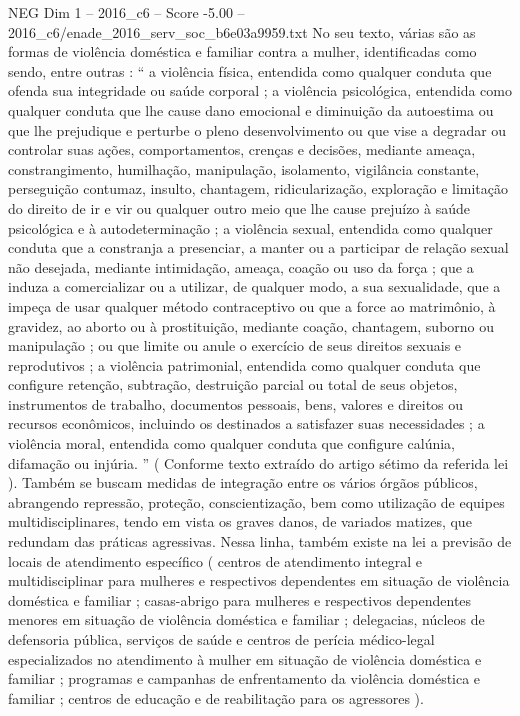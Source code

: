 \begin{textsample}{NEG Dim 1 – 2016\_c6 – Score -5.00 – 2016\_c6/enade\_2016\_serv\_soc\_b6e03a9959.txt}
No seu texto, várias são as formas de violência doméstica e familiar contra a mulher, identificadas como sendo, entre outras : “ a violência física, entendida como qualquer conduta que ofenda sua integridade ou saúde corporal ; a violência psicológica, entendida como qualquer conduta que lhe cause dano emocional e diminuição da autoestima ou que lhe prejudique e perturbe o pleno desenvolvimento ou que vise a degradar ou controlar suas ações, comportamentos, crenças e decisões, mediante ameaça, constrangimento, humilhação, manipulação, isolamento, vigilância constante, perseguição contumaz, insulto, chantagem, ridicularização, exploração e limitação do direito de ir e vir ou qualquer outro meio que lhe cause prejuízo à saúde psicológica e à autodeterminação ; a violência sexual, entendida como qualquer conduta que a constranja a presenciar, a manter ou a participar de relação sexual não desejada, mediante intimidação, ameaça, coação ou uso da força ; que a induza a comercializar ou a utilizar, de qualquer modo, a sua sexualidade, que a impeça de usar qualquer método contraceptivo ou que a force ao matrimônio, à gravidez, ao aborto ou à prostituição, mediante coação, chantagem, suborno ou manipulação ; ou que limite ou anule o exercício de seus direitos sexuais e reprodutivos ; a violência patrimonial, entendida como qualquer conduta que configure retenção, subtração, destruição parcial ou total de seus objetos, instrumentos de trabalho, documentos pessoais, bens, valores e direitos ou recursos econômicos, incluindo os destinados a satisfazer suas necessidades ; a violência moral, entendida como qualquer conduta que configure calúnia, difamação ou injúria. ” ( Conforme texto extraído do artigo sétimo da referida lei ).
Também se buscam medidas de integração entre os vários órgãos públicos, abrangendo repressão, proteção, conscientização, bem como utilização de equipes multidisciplinares, tendo em vista os graves danos, de variados matizes, que redundam das práticas agressivas.
Nessa linha, também existe na lei a previsão de locais de atendimento específico ( centros de atendimento integral e multidisciplinar para mulheres e respectivos dependentes em situação de violência doméstica e familiar ; casas-abrigo para mulheres e respectivos dependentes menores em situação de violência doméstica e familiar ; delegacias, núcleos de defensoria pública, serviços de saúde e centros de perícia médico-legal especializados no atendimento à mulher em situação de violência doméstica e familiar ; programas e campanhas de enfrentamento da violência doméstica e familiar ; centros de educação e de reabilitação para os agressores ).

\end{textsample}
